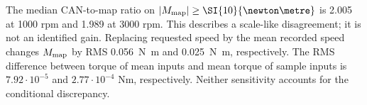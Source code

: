 The median CAN-to-map ratio on $|M_{\rm map}|\ge\SI{10}{\newton\metre}$ is 2.005 at 1000 rpm and 1.989 at 3000 rpm. This describes a scale-like disagreement; it is not an identified gain. Replacing requested speed by the mean recorded speed changes $M_{\rm map}$ by RMS \SI{0.056}{\newton\metre} and \SI{0.025}{\newton\metre}, respectively. The RMS difference between torque of mean inputs and mean torque of sample inputs is $ 7.92\cdot10^{-5}$ and $ 2.77\cdot10^{-4}$ Nm, respectively. Neither sensitivity accounts for the conditional discrepancy.
